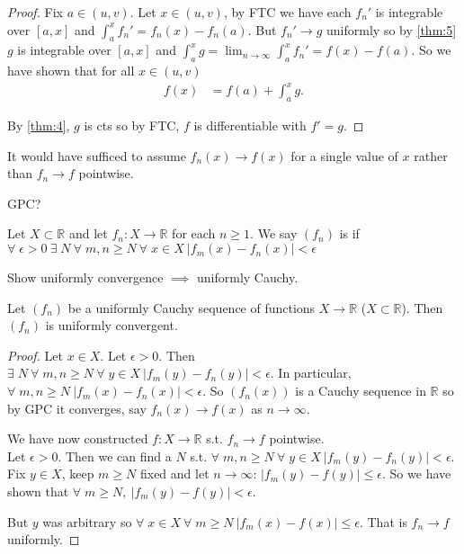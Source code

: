 \begin{proof}
    Fix $a \in (u, v)$.
    Let $x \in (u, v)$, by FTC we have each $f_n'$ is integrable over $[a, x]$ and $\int_{a}^{x} f_n' = f_n(x) - f_n(a)$.
    But $f_n' \to g$ uniformly so by \cref{thm:5} $g$ is integrable over $[a, x]$ and $\int_{a}^{x} g = \lim_{n \to \infty} \int_{a}^{x} f_n' = f(x) - f(a)$.
    So we have shown that for all $x \in (u, v)$
    \begin{align*}
        f(x) &= f(a) + \int_a^x g.
    \end{align*} 

    By \cref{thm:4}, $g$ is cts so by FTC, $f$ is differentiable with $f' = g$.
\end{proof} 

\begin{remark}
    It would have sufficed to assume $f_n(x) \to f(x)$ for a single value of $x$ rather than $f_n \to f$ pointwise.
\end{remark} 

GPC?

\begin{definition}
    Let $X \subset \mathbb{R}$ and let $f_n : X \to \mathbb{R}$ for each $n \geq 1$.
    We say $(f_n)$ is  if $\forall \; \epsilon > 0 \ \exists \; N \ \forall \; m, n \geq N \ \forall \; x \in X \ |f_m(x) - f_n(x)| < \epsilon$
\end{definition} 

\begin{exercise}
    Show uniformly convergence $\implies$ uniformly Cauchy.
\end{exercise} 

\begin{theorem} \label{thm:7}
    Let $(f_n)$ be a uniformly Cauchy sequence of functions $X \to \mathbb{R}$ ($X \subset \mathbb{R}$).
    Then $(f_n)$ is uniformly convergent.
\end{theorem} 

\begin{proof}
    Let $x \in X$.
    Let $\epsilon > 0$.
    Then $\exists \; N \ \forall \; m,n \geq N \ \forall \; y \in X \ |f_m(y) - f_n(y)| < \epsilon$.
    In particular, $\forall \; m, n \geq N \ |f_m(x) - f_n(x)| < \epsilon$.
    So $(f_n(x))$ is a Cauchy sequence in $\mathbb{R}$ so by GPC it converges, say $f_n(x) \to f(x)$ as $n \to \infty$. 

    We have now constructed $f : X \to \mathbb{R}$ s.t. $f_n \to f$ pointwise. \\
    Let $\epsilon > 0$.
    Then we can find a $N$ s.t. $\forall \; m, n \geq N \ \forall \; y \in X \ |f_m(y) - f_n(y)| < \epsilon$.
    Fix $y \in X$, keep $m \geq N$ fixed and let $n \to \infty$: $|f_m(y) - f(y)| \leq \epsilon$.
    So we have shown that $\forall \; m \geq N,\ |f_m(y) - f(y)| < \epsilon$.

    But $y$ was arbitrary so $\forall \; x \in X \ \forall \; m \geq N \ |f_m(x) - f(x)| \leq \epsilon$.
    That is $f_n \to f$ uniformly.
\end{proof} 

